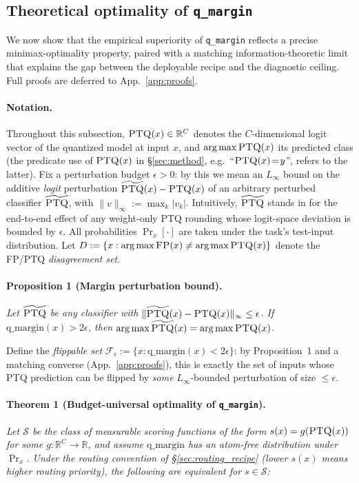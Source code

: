 \documentclass{article}
\newcommand{\fp}{\textsc{FP}\xspace}
\newcommand{\ptq}{\textsc{PTQ}\xspace}
\begin{document}
\subsection{Theoretical optimality of \texttt{q\_margin}}\label{sec:theory}

We now show that the empirical superiority of \texttt{q\_margin} reflects a precise minimax-optimality property, paired with a matching information-theoretic limit that explains the gap between the deployable recipe and the diagnostic ceiling. Full proofs are deferred to App.~\ref{app:proofs}.

\paragraph{Notation.}
Throughout this subsection, $\ptq(x) \in \mathbb R^C$ denotes the $C$-dimensional logit vector of the quantized model at input $x$, and $\arg\max\ptq(x)$ its predicted class (the predicate use of $\ptq(x)$ in \S\ref{sec:method}, e.g.\ ``$\ptq(x)\!=\!y$'', refers to the latter). Fix a perturbation budget $\epsilon > 0$: by this we mean an $L_\infty$ bound on the additive \emph{logit} perturbation $\widetilde{\ptq}(x) - \ptq(x)$ of an arbitrary perturbed classifier $\widetilde{\ptq}$, with $\|v\|_\infty := \max_k |v_k|$. Intuitively, $\widetilde{\ptq}$ stands in for the end-to-end effect of any weight-only \ptq{} rounding whose logit-space deviation is bounded by $\epsilon$. All probabilities $\Pr_x[\cdot]$ are taken under the task's test-input distribution. Let $D := \{x : \arg\max\fp(x) \neq \arg\max\ptq(x)\}$ denote the \fp{}/\ptq{} \emph{disagreement set}.

\paragraph{Proposition 1 (Margin perturbation bound).}
\emph{Let $\widetilde{\ptq}$ be any classifier with $\|\widetilde{\ptq}(x) - \ptq(x)\|_\infty \leq \epsilon$. If $\mathrm{q\_margin}(x) > 2\epsilon$, then $\arg\max\widetilde{\ptq}(x) = \arg\max\ptq(x)$.}

Define the \emph{flippable set} $\mathcal F_\epsilon := \{x : \mathrm{q\_margin}(x) < 2\epsilon\}$: by Proposition~1 and a matching converse (App.~\ref{app:proofs}), this is exactly the set of inputs whose \ptq{} prediction can be flipped by \emph{some} $L_\infty$-bounded perturbation of size $\leq\epsilon$.

\paragraph{Theorem 1 (Budget-universal optimality of \texttt{q\_margin}).}
\emph{Let $\mathcal S$ be the class of measurable scoring functions of the form $s(x) = g(\ptq(x))$ for some $g : \mathbb R^C \to \mathbb R$, and assume $\mathrm{q\_margin}$ has an atom-free distribution under $\Pr_x$. Under the routing convention of \S\ref{sec:routing_recipe} (lower $s(x)$ means higher routing priority), the following are equivalent for $s \in \mathcal S$:}
\end{document}
